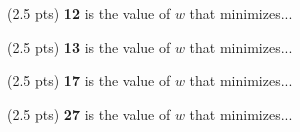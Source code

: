 \documentclass[11pt]{article}
\begin{document}
\begin{prob}
\begin{subprob}
     

\end{subprob}

\begin{subprob}(2.5 pts) \textbf{12} is the value of $w$ that minimizes...

     

\end{subprob}

\begin{subprob}(2.5 pts) \textbf{13} is the value of $w$ that minimizes...

     

\end{subprob}

\begin{subprob}(2.5 pts) \textbf{17} is the value of $w$ that minimizes...

     

\end{subprob}

\begin{subprob}(2.5 pts) \textbf{27} is the value of $w$ that minimizes...

     

\end{subprob}

\end{prob}

\newpage
\end{document}
